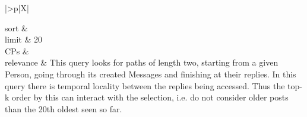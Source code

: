 \begin{tabularx}{\queryCardWidth}{|>{\queryPropertyCell}p{\queryPropertyCellWidth}|X|}
%
	
		sort		&
		\innerCardVSpace \\ \hline
	limit & 20 \\ \hline
	CPs &
	 \\ \hline
	relevance &
		\footnotesize This query looks for paths of length two, starting from a given Person, going through its created Messages and
finishing at their replies. In this query there is temporal locality between the replies being accessed. Thus the top-k
order by this can interact with the selection, i.e. do not consider older posts than the 20th oldest seen so far.
 \\ \hline%
\end{tabularx}
\queryCardVSpace

\let\emph\oldemph